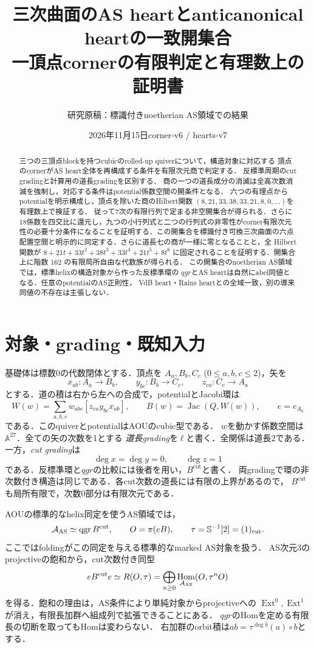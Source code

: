 \documentclass[11pt,a4paper]{ltjsarticle}
\title{三次曲面のAS heartとanticanonical heartの一致開集合\\\large 一頂点cornerの有限判定と有理数上の証明書}
\author{研究原稿：標識付きnoetherian AS領域での結果}
\date{2026年11月15日\quad corner-v6 / hearts-v7}
\theoremstyle{definition}\newtheorem{remark}[theorem]{注意}
\DeclareMathOperator{\qgr}{qgr}\DeclareMathOperator{\Hom}{Hom}\DeclareMathOperator{\Ext}{Ext}
\DeclareMathOperator{\Jac}{Jac}\DeclareMathOperator{\Spec}{Spec}
\begin{document}
\maketitle
\begin{abstract}
三つの三頂点blockを持つcubicのrolled-up quiverについて，構造対象に対応する
頂点のcornerがAS heart全体を再構成する条件を有限次元商で判定する．
反標準周期のcut gradingと計算用の道長gradingを区別する．
商の一つの道長成分の消滅は全高次数消滅を強制し，対応する条件はpotential係数空間の開条件となる．
六つの有理点からpotentialを明示構成し，頂点を除いた商のHilbert関数
$(8,21,33,38,33,21,8,0,\ldots)$を有理数上で検証する．
従って7次の有限行列で定まる非空開集合が得られる．さらに18係数を四交比に還元し，九つの小行列式と二つの行列式の非零性がcorner有限次元性の必要十分条件になることを証明する．この開集合を標識付き可換三次曲面の六点配置空間と明示的に同定する．さらに道長七の商が一様に零となることと，全 Hilbert 関数が $8+21t+33t^2+38t^3+33t^4+21t^5+8t^6$ に固定されることを証明する．開集合上に階数 $162$ の有限局所自由な代数族が得られる．
この開集合のnoetherian AS領域では，標準helixの構造対象から作った反標準環の
$qgr$とAS heartは自然にabel同値となる．任意のpotentialのAS正則性，
VdB heart・Rains heartとの全域一致，別の導来同値の不存在は主張しない．
\end{abstract}

\section{対象・grading・既知入力}
基礎体は標数0の代数閉体とする．頂点を
$A_a,B_b,C_c$ ($0\le a,b,c\le2$)，矢を
\[
 x_{ab}:A_a\to B_b,\qquad y_{bc}:B_b\to C_c,\qquad z_{ca}:C_c\to A_a
\]
とする．道の積は右から左への合成で，potentialとJacobi環は
\[
 W(w)=\sum_{a,b,c}w_{abc}[z_{ca}y_{bc}x_{ab}],\qquad
 B(w)=\Jac(Q,W(w)),\qquad e=e_{A_0}
\]
である．このquiverとpotentialはAOU\cite[\S4]{AOU}のcubic型である．
$w$を動かす係数空間は$\mathbb A^{27}$．全ての矢の次数を1とする
\emph{道長grading}を$\ell$と書く．全関係は道長2である．
一方，\emph{cut grading}は
\[
 \deg x=\deg y=0,\qquad\deg z=1
\]
である．反標準環と$qgr$の比較には後者を用い，$B^{\mathrm{cut}}$と書く．
両gradingで環の非次数付き構造は同じである．各cut次数の道長には有限の上界があるので，
$B^{\mathrm{cut}}$も局所有限で，次数0部分は有限次元である．

AOU\cite[(3.19), (4.9), (4.13)]{AOU}の標準的なhelix同定を使うAS領域では，
\[
 \cA_{\mathrm{AS}}\simeq\qgr B^{\mathrm{cut}},\qquad
 O=\pi(eB),\qquad \tau=\mathbb S^{-1}[2]=(1)_{\mathrm{cut}}.
\]
ここではfoldingがこの同定を与える標準的なmarked AS対象を扱う．
AS次元3のprojectiveの飽和から，cut次数付き同型
\begin{equation}\label{eq:orbit}
 eB^{\mathrm{cut}}e\simeq R(O,\tau)
 =\bigoplus_{n\ge0}\Hom_{\cA_{\mathrm{AS}}}(O,\tau^nO)
\end{equation}
を得る．飽和の理由は，AS条件により単純対象からprojectiveへの
$\Ext^0,\Ext^1$が消え，有限長加群へ組成列で拡張できることにある．
$qgr$のHomを定める有限長の切断を取ってもHomは変わらない．
右加群のorbit積は$ab=\tau^{\deg b}(a)\circ b$とする．
\end{document}
